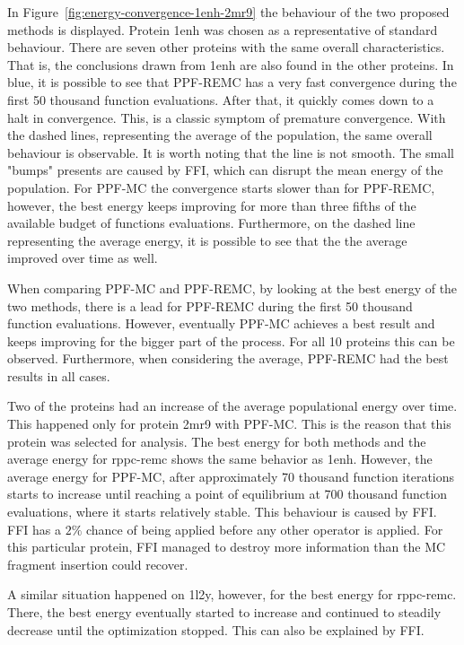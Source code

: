 In Figure~\ref{fig:energy-convergence-1enh-2mr9} the behaviour of the two
proposed methods is displayed. Protein 1enh was chosen as a representative
of standard behaviour.
There are seven other proteins with the same overall characteristics. That is,
the conclusions drawn from 1enh are also found in the other proteins.
In blue, it is possible to see that PPF-REMC has a very fast
convergence during the first 50 thousand function evaluations. After that, it
quickly comes down to a halt in convergence. This, is a classic symptom of
premature convergence. With the dashed lines, representing the average of the
population, the same overall behaviour is observable. It is worth noting that
the line is not smooth. The small "bumps" presents are caused by FFI, which
can disrupt the mean energy of the population. For PPF-MC the convergence
starts slower than for PPF-REMC, however, the best energy keeps improving
for more than three fifths of the available budget of functions evaluations.
Furthermore, on the dashed line representing the average energy, it is possible
to see that the the average improved over time as well.

When comparing PPF-MC and PPF-REMC, by looking at the best energy of the two
methods, there is a lead for PPF-REMC during the first 50 thousand function
evaluations. However, eventually PPF-MC achieves a best result and keeps
improving for the bigger part of the process. For all 10 proteins this can be
observed. Furthermore, when considering the average, PPF-REMC had the best
results in all cases.

Two of the proteins had an increase of the average populational energy over time.
This happened only for protein 2mr9 with PPF-MC. This is the reason that this
protein was selected for analysis. The best energy for both methods and the
average energy for rppc-remc shows the same behavior as 1enh. However, the
average energy for PPF-MC, after approximately 70 thousand function iterations
starts to increase until reaching a point of equilibrium at 700 thousand
function evaluations, where it starts relatively stable. This behaviour is
caused by FFI. FFI has a $2\%$ chance of being applied before any other operator
is applied. For this particular protein, FFI managed to destroy more information
than the MC fragment insertion could recover.

A similar situation happened on 1l2y, however, for the best energy for
rppc-remc. There, the best energy eventually started to increase and continued
to steadily decrease until the optimization stopped. This can also be explained
by FFI.

